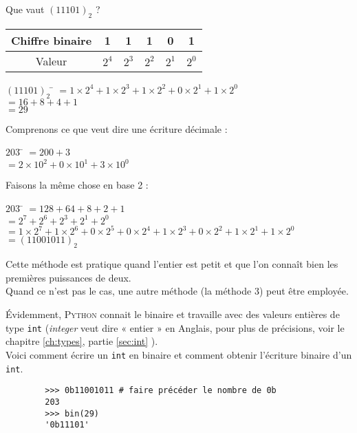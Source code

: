 \begin{methode}
    Que vaut $(11101)_2$ ?
    \begin{center}
        \alternaterowcolors[UGLiPurple]
        \begin{tabular}{|c|c|c|c|c|c|}
            \hline
            Chiffre binaire & 1     & 1     & 1     & 0     & 1     \\
            \hline
            Valeur          & $2^4$ & $2^3$ & $2^2$ & $2^1$ & $2^0$ \\
            \hline
        \end{tabular}
    \end{center}
    \begin{tabbing}
        $(11101)_2$	\= 	$=1\times 2^4+1\times 2^3+1\times 2^2+0\times 2^1+1\times 2^0$	\\
        \>	$=16+8+4+1$	\\
        \>	$=29$
    \end{tabbing}\nopagebreak
\end{methode}

\begin{methode}
    Comprenons ce que veut dire une écriture décimale :
    \begin{tabbing}
        $203$	\= 	$=200+3$	\\

        \>	$=2\times 10^2+0\times 10^1+3\times 10^0$
    \end{tabbing}
    Faisons la même chose en base 2 :
    \begin{tabbing}
        $203$	\= 	$=128+64+8+2+1$	\\

        \>	$=2^7+2^6+2^3+2^1+2^0$	\\

        \>	$=1\times 2^7+1\times 2^6+0\times 2^5 + 0\times 2^4 +1\times 2^3+0\times 2^2 + 1\times
            2^1+1\times 2^0$	\\

        \> $=(11001011)_2$
    \end{tabbing}
    Cette méthode est pratique quand l'entier est petit et que l'on connaît bien les premières puissances de deux.\\
    Quand ce n'est pas le cas, une autre méthode (la méthode 3) peut être employée.

\end{methode}
\'Evidemment, \textsc{Python} connait le binaire et travaille avec des valeurs entières de type \texttt{int} (\textit{integer} veut dire « entier » en Anglais, pour plus de précisions, voir le chapitre \ref{ch:types}, partie \ref{sec:int} ).\\
Voici comment écrire un \texttt{int} en binaire et comment obtenir l'écriture
binaire d'un \texttt{int}.
\begin{pys}
    \begin{verbatim}
        >>> 0b11001011 # faire précéder le nombre de 0b
        203
        >>> bin(29)
        '0b11101'
    \end{verbatim}
\end{pys}

